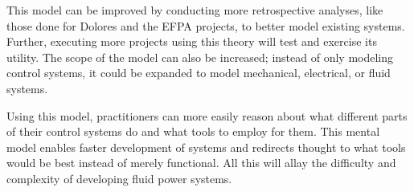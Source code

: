 \documentclass[english,12pt,a4paper,pdftex,eng,utf8]{aaltothesis}
\begin{document}
This model can be improved by conducting more retrospective analyses, like those done for Dolores and the EFPA projects, to better model existing systems. Further, executing more projects using this theory will test and exercise its utility. The scope of the model can also be increased; instead of only modeling control systems, it could be expanded to model mechanical, electrical, or fluid systems.

Using this model, practitioners can more easily reason about what different parts of their control systems do and what tools to employ for them. This mental model enables faster development of systems and redirects thought to what tools would be best instead of merely functional. All this will allay the difficulty and complexity of developing fluid power systems.

\clearpage

{}



\end{document}
